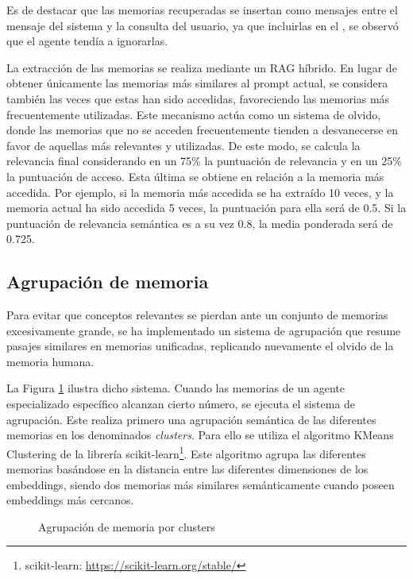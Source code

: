 Es de destacar que las memorias recuperadas se insertan como mensajes  entre el mensaje del sistema y la consulta del usuario, ya que incluirlas en el , se observó que el agente tendía a ignorarlas.

La extracción de las memorias se realiza mediante un RAG híbrido. En lugar de obtener únicamente las memorias más similares al prompt actual, se considera también las veces que estas han sido accedidas, favoreciendo las memorias más frecuentemente utilizadas. Este mecanismo actúa como un sistema de olvido, donde las memorias que no se acceden frecuentemente tienden a desvanecerse en favor de aquellas más relevantes y utilizadas. De este modo, se calcula la relevancia final considerando en un 75\% la puntuación de relevancia y en un 25\% la puntuación de acceso. Esta última se obtiene en relación a la memoria más accedida. Por ejemplo, si la memoria más accedida se ha extraído 10 veces, y la memoria actual ha sido accedida 5 veces, la puntuación para ella será de 0.5. Si la puntuación de relevancia semántica es a su vez 0.8, la media ponderada será de 0.725.

\subsection{Agrupación de memoria}
Para evitar que conceptos relevantes se pierdan ante un conjunto de memorias excesivamente grande, se ha implementado un sistema de agrupación que resume pasajes similares en memorias unificadas, replicando nuevamente el olvido de la memoria humana.

La Figura \ref{fig:mem_2} ilustra dicho sistema. Cuando las memorias de un agente especializado específico alcanzan cierto número, se ejecuta el sistema de agrupación. Este realiza primero una agrupación semántica de las diferentes memorias en los denominados \textit{clusters}. Para ello se utiliza el algoritmo KMeans Clustering de la librería scikit-learn\footnote{scikit-learn: \url{https://scikit-learn.org/stable/}}. Este algoritmo agrupa las diferentes memorias basándose en la distancia entre las diferentes dimensiones de los embeddings, siendo dos memorias más similares semánticamente cuando poseen embeddings más cercanos.

\begin{figure}[h]
\centering
{}
\caption{Agrupación de memoria por clusters}
\label{fig:mem_2}
\end{figure}

